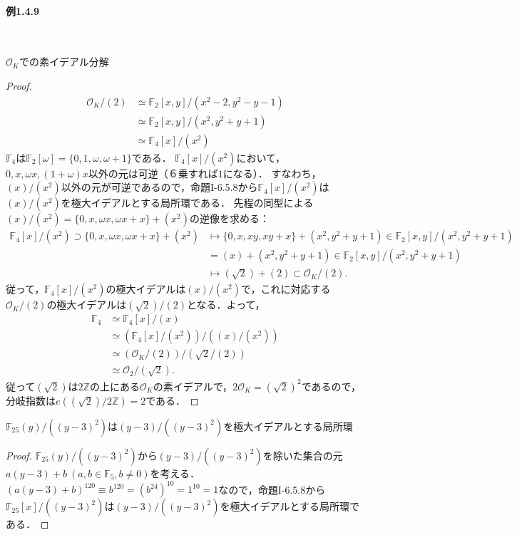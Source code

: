 \paragraph{例1.4.9}~
\begin{screen}
  $\mathcal{O}_K$での素イデアル分解
\end{screen}
\begin{proof}
  \begin{align*}
    \mathcal{O}_K/(2) &\simeq \mathbb{F}_2[x, y]/(x^2-2, y^2-y-1) \\
    &\simeq \mathbb{F}_2[x, y]/(x^2, y^2 + y + 1) \\
    &\simeq\mathbb{F}_4[x]/(x^2)
  \end{align*}
  $\mathbb{F}_4$は$\mathbb{F}_2[\omega] = \{0, 1, \omega, \omega + 1\}$である．
  $\mathbb{F}_4[x]/(x^2)$において，$0, x, \omega x, (1 + \omega)x$以外の元は可逆（６乗すれば$1$になる）．
  すなわち，$(x)/(x^2)$以外の元が可逆であるので，命題I-6.5.8から$\mathbb{F}_4[x]/(x^2)$は$(x)/(x^2)$を極大イデアルとする局所環である．
  先程の同型による$(x)/(x^2) = \{0, x, \omega x, \omega x + x\} + (x^2)$の逆像を求める：
  \begin{align*}
    \mathbb{F}_4[x]/(x^2) \supset \{0, x, \omega x, \omega x + x\} + (x^2) &\mapsto \{0, x, xy, xy + x\} + (x^2, y^2 + y + 1) \in \mathbb{F}_2[x, y]/(x^2, y^2 + y + 1) \\
    & =  (x) + (x^2, y^2 + y + 1) \in \mathbb{F}_2[x, y]/(x^2, y^2 + y + 1) \\
    &\mapsto (\sqrt{2}) + (2) \subset \mathcal{O}_K/(2).
  \end{align*}
  従って，$\mathbb{F}_4[x]/(x^2)$の極大イデアルは$(x)/(x^2)$で，これに対応する$\mathcal{O}_K/(2)$の極大イデアルは$(\sqrt{2})/(2)$となる．よって，
  \begin{align*}
    \mathbb{F}_4 &\simeq \mathbb{F}_4[x]/(x) \\
    &\simeq (\mathbb{F}_4[x]/(x^2))/((x)/(x^2)) \\
    &\simeq (\mathcal{O}_K/(2))/(\sqrt{2}/(2)) \\
    &\simeq \mathcal{O}_2/(\sqrt{2}).
  \end{align*}
  従って$(\sqrt{2})$は$2\mathbb{Z}$の上にある$\mathcal{O}_K$の素イデアルで，$2\mathcal{O}_K = (\sqrt{2})^2$であるので，分岐指数は$e((\sqrt{2})/2\mathbb{Z}) = 2$である．
\end{proof}

\begin{screen}
  $\mathbb{F}_{25}(y)/((y-3)^2)$は$(y-3)/((y-3)^2)$を極大イデアルとする局所環
\end{screen}
\begin{proof}
  $\mathbb{F}_{25}(y)/((y-3)^2)$から$(y-3)/((y-3)^2)$を除いた集合の元$a(y-3) + b\ (a, b\in\mathbb{F}_5, b\neq 0)$を考える．
  $(a(y-3) + b)^{120}\equiv b^{120} = (b^{24})^{10} = 1^{10} = 1$なので，命題I-6.5.8から$\mathbb{F}_{25}[x]/((y-3)^2)$は$(y-3)/((y-3)^2)$を極大イデアルとする局所環である．
\end{proof}

